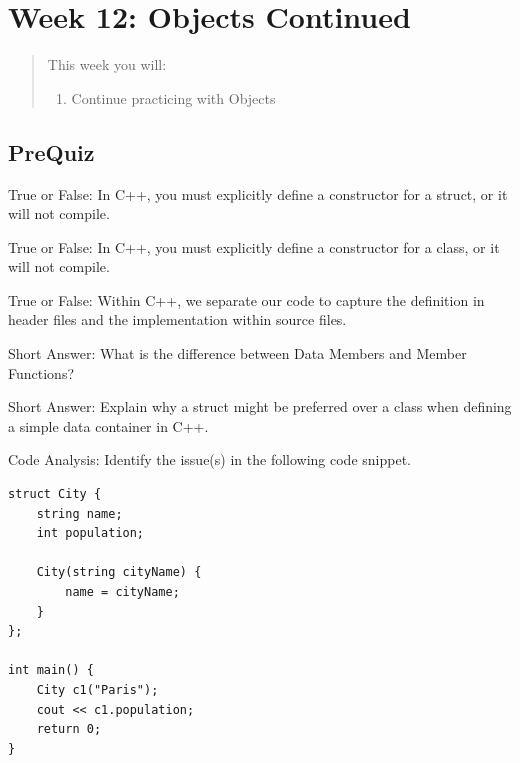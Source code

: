 \chapter*{Week 12: Objects Continued}
\setcounter{chapter}{13}
\setcounter{section}{0}

\begin{abstract}
This week you will:
\begin{enumerate}
    \item Continue practicing with Objects

\end{enumerate}
    
\end{abstract}

\section{PreQuiz}
\begin{problem}
True or False: In C++, you must explicitly define a constructor for a struct, or it will not compile.
\end{problem}

\begin{problem}
True or False: In C++, you must explicitly define a constructor for a class, or it will not compile.
\end{problem}

\begin{problem}
True or False: Within C++, we separate our code to capture the definition in header files and the implementation within source files.
\end{problem}

\begin{problem}
Short Answer: What is the difference between Data Members and Member Functions?
\end{problem}

\begin{problem}
Short Answer: Explain why a struct might be preferred over a class when defining a simple data container in C++.
\end{problem}

\begin{problem}
Code Analysis: Identify the issue(s) in the following code snippet.
\begin{verbatim}
struct City {
    string name;
    int population;

    City(string cityName) {
        name = cityName;
    }
};

int main() {
    City c1("Paris");
    cout << c1.population;
    return 0;
}
\end{verbatim}
\end{problem}

